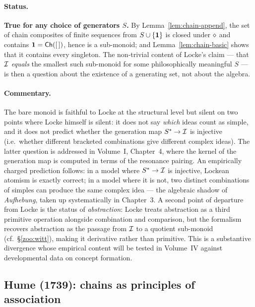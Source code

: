 \paragraph{Status.}
\textbf{True for any choice of generators $S$.}  By
Lemma~\ref{lem:chain-append}, the set of chain composites of finite
sequences from $S \cup \{\mathbf{1}\}$ is closed under $\mathbin{\diamond}$ and contains
$\mathbf{1} = \mathsf{Ch}([\,])$, hence is a sub-monoid; and Lemma~\ref{lem:chain-basic}
shows that it contains every singleton.  The non-trivial content of
Locke's claim --- that $\mathcal{I}$ \emph{equals} the smallest such sub-monoid
for some philosophically meaningful $S$ --- is then a question about the
existence of a generating set, not about the algebra.

\paragraph{Commentary.}
The bare monoid is faithful to Locke at the structural level but silent on
two points where Locke himself is silent: it does not say \emph{which}
ideas count as simple, and it does not predict whether the generation map
$S^{*} \to \mathcal{I}$ is injective (i.e.\ whether different bracketed
combinations give different complex ideas).  The latter question is
addressed in Volume~I, Chapter~4, where the kernel of the generation map
is computed in terms of the resonance pairing.  An empirically charged
prediction follows: in a model where $S^{*} \to \mathcal{I}$ is injective,
Lockean atomism is exactly correct; in a model where it is not, two
distinct combinations of simples can produce the same complex idea --- the
algebraic shadow of \emph{Aufhebung}, taken up systematically in
Chapter~3.  A second point of departure from Locke is the status of
\emph{abstraction}: Locke treats abstraction as a third primitive
operation alongside combination and comparison, but the formalism
recovers abstraction as the passage from $\mathcal{I}$ to a quotient
sub-monoid (cf.\ \S\ref{zoo:witt}), making it derivative rather than
primitive.  This is a substantive divergence whose empirical content will
be tested in Volume~IV against developmental data on concept formation.

\subsection*{Hume (1739): chains as principles of association}\label{zoo:hume}

